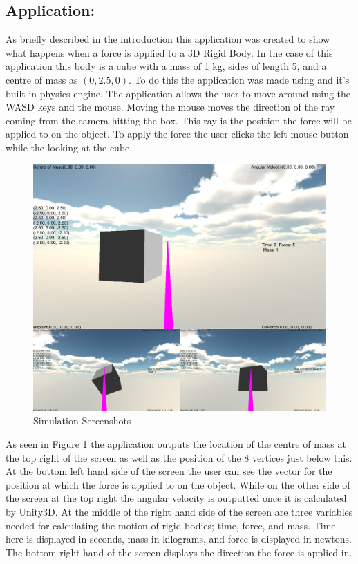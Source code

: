 \subsection{Application:}
As briefly described in the introduction this application was created to show what happens when a force is applied to a 3D Rigid Body.
In the case of this application this body is a cube with a mass of 1 kg, sides of length 5, and a centre of mass as $(0,2.5,0)$.
To do this the application was made using \citet{unity2013} and it's built in physics engine.
The application allows the user to move around using the WASD keys and the mouse.
Moving the mouse moves the direction of the ray coming from the camera hitting the box.
This ray is the position the force will be applied to on the object. To apply the force the user clicks the left mouse button while the looking at the cube.

\begin{figure}[h!]
	\centering
	\includegraphics[width=\textwidth]{images/Simulation.PNG}
	\caption{Simulation Screenshots}
	\label{fig:Simulation}
\end{figure}

As seen in Figure \ref{fig:Simulation} the application outputs the location of the centre of mass at the top right of the screen as well as the position of the 8 vertices just below this.
At the bottom left hand side of the screen the user can see the vector for the position at which the force is applied to on the object.
While on the other side of the screen at the top right the angular velocity is outputted once it is calculated by Unity3D.
At the middle of the right hand side of the screen are three variables needed for calculating the motion of rigid bodies; time, force, and mass.
Time here is displayed in seconds, mass in kilograms, and force is displayed in newtons.
The bottom right hand of the screen displays the direction the force is applied in.